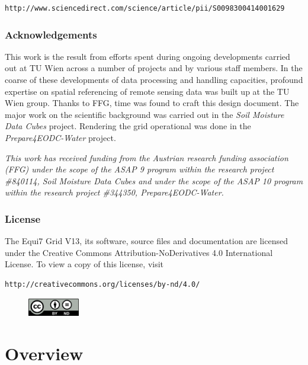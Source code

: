 \documentclass[10pt,a4paper]{article}
\begin{document}
\begin{lstlisting}
http://www.sciencedirect.com/science/article/pii/S0098300414001629
\end{lstlisting}

\subsubsection*{Acknowledgements}
This work is the result from efforts spent during ongoing developments carried out at TU Wien across a number of projects and by various staff members. In the coarse of these developments of data processing and handling capacities, profound expertise on spatial referencing of remote sensing data was built up at the TU Wien group. Thanks to FFG, time was found to craft this design document. The major work on the scientific background was carried out in the \textit{Soil Moisture Data Cubes} project. Rendering the grid operational was done in the \textit{Prepare4EODC-Water} project.

\textit{This work has received funding from the Austrian research funding association (FFG) under the scope of the ASAP 9 program within the research project \#840114, Soil Moisture Data Cubes and under the scope of the ASAP 10 program within the research project \#344350, Prepare4EODC-Water.}

\subsubsection*{License}
The Equi7 Grid V13, its software, source files and documentation are licensed under the Creative Commons Attribution-NoDerivatives 4.0 International License. To view a copy of this license, visit

\begin{lstlisting}
http://creativecommons.org/licenses/by-nd/4.0/
\end{lstlisting}

\begin{figure}[hbtp]
\centering
\includegraphics[width=0.2\textwidth]{cc_by-nd}
\end{figure}

\newpage

\parskip 10pt

\section{Overview}
\label{sec:overview}
\end{document}
